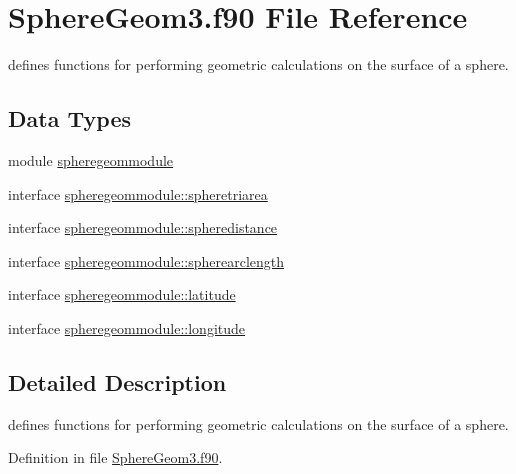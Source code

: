 \hypertarget{SphereGeom3_8f90}{\section{Sphere\+Geom3.\+f90 File Reference}
\label{SphereGeom3_8f90}
}


defines functions for performing geometric calculations on the surface of a sphere.  


\subsection*{Data Types}
\begin{DoxyCompactItemize}
\item 
module \hyperlink{classspheregeommodule}{spheregeommodule}
\item 
interface \hyperlink{interfacespheregeommodule_1_1spheretriarea}{spheregeommodule\+::spheretriarea}
\item 
interface \hyperlink{interfacespheregeommodule_1_1spheredistance}{spheregeommodule\+::spheredistance}
\item 
interface \hyperlink{interfacespheregeommodule_1_1spherearclength}{spheregeommodule\+::spherearclength}
\item 
interface \hyperlink{interfacespheregeommodule_1_1latitude}{spheregeommodule\+::latitude}
\item 
interface \hyperlink{interfacespheregeommodule_1_1longitude}{spheregeommodule\+::longitude}
\end{DoxyCompactItemize}


\subsection{Detailed Description}
defines functions for performing geometric calculations on the surface of a sphere. 



Definition in file \hyperlink{SphereGeom3_8f90_source}{Sphere\+Geom3.\+f90}.

